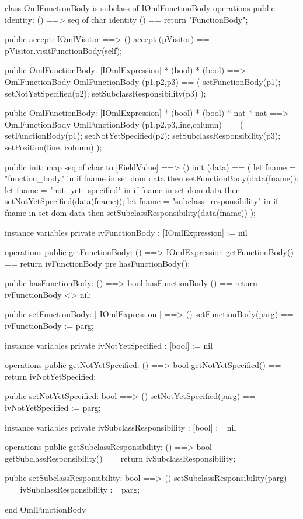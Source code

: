 \begin{vdm_al}
class OmlFunctionBody is subclass of IOmlFunctionBody
operations
  public identity: () ==> seq of char
  identity () == return "FunctionBody";

  public accept: IOmlVisitor ==> ()
  accept (pVisitor) == pVisitor.visitFunctionBody(self);

  public OmlFunctionBody:
    [IOmlExpression] *
    (bool) *
    (bool) ==> OmlFunctionBody
  OmlFunctionBody (p1,p2,p3) == 
    ( setFunctionBody(p1);
      setNotYetSpecified(p2);
      setSubclassResponsibility(p3) );

  public OmlFunctionBody:
    [IOmlExpression] *
    (bool) *
    (bool) *
    nat *
    nat ==> OmlFunctionBody
  OmlFunctionBody (p1,p2,p3,line,column) == 
    ( setFunctionBody(p1);
      setNotYetSpecified(p2);
      setSubclassResponsibility(p3);
      setPosition(line, column) );

  public init: map seq of char to [FieldValue] ==> ()
  init (data) ==
    ( let fname = "function_body" in
        if fname in set dom data
        then setFunctionBody(data(fname));
      let fname = "not_yet_specified" in
        if fname in set dom data
        then setNotYetSpecified(data(fname));
      let fname = "subclass_responsibility" in
        if fname in set dom data
        then setSubclassResponsibility(data(fname)) );

instance variables
  private ivFunctionBody : [IOmlExpression] := nil

operations
  public getFunctionBody: () ==> IOmlExpression
  getFunctionBody() == return ivFunctionBody
    pre hasFunctionBody();

  public hasFunctionBody: () ==> bool
  hasFunctionBody () == return ivFunctionBody <> nil;

  public setFunctionBody: [ IOmlExpression ] ==> ()
  setFunctionBody(parg) == ivFunctionBody := parg;

instance variables
  private ivNotYetSpecified : [bool] := nil

operations
  public getNotYetSpecified: () ==> bool
  getNotYetSpecified() == return ivNotYetSpecified;

  public setNotYetSpecified: bool ==> ()
  setNotYetSpecified(parg) == ivNotYetSpecified := parg;

instance variables
  private ivSubclassResponsibility : [bool] := nil

operations
  public getSubclassResponsibility: () ==> bool
  getSubclassResponsibility() == return ivSubclassResponsibility;

  public setSubclassResponsibility: bool ==> ()
  setSubclassResponsibility(parg) == ivSubclassResponsibility := parg;

end OmlFunctionBody
\end{vdm_al}

